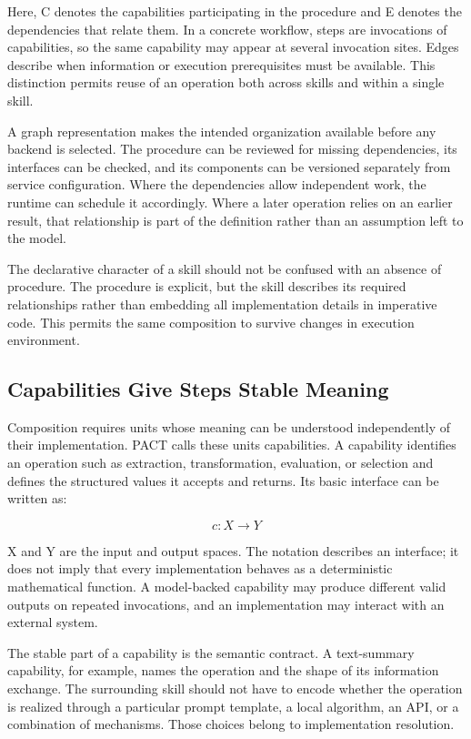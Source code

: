 \documentclass[10pt,twocolumn,a4paper]{article}
\begin{document}
Here, C denotes the capabilities participating in the procedure and E denotes the dependencies that relate them. In a concrete workflow, steps are invocations of capabilities, so the same capability may appear at several invocation sites. Edges describe when information or execution prerequisites must be available. This distinction permits reuse of an operation both across skills and within a single skill.


A graph representation makes the intended organization available before any backend is selected. The procedure can be reviewed for missing dependencies, its interfaces can be checked, and its components can be versioned separately from service configuration. Where the dependencies allow independent work, the runtime can schedule it accordingly. Where a later operation relies on an earlier result, that relationship is part of the definition rather than an assumption left to the model.


The declarative character of a skill should not be confused with an absence of procedure. The procedure is explicit, but the skill describes its required relationships rather than embedding all implementation details in imperative code. This permits the same composition to survive changes in execution environment.


\subsection{Capabilities Give Steps Stable Meaning}

Composition requires units whose meaning can be understood independently of their implementation. PACT calls these units capabilities. A capability identifies an operation such as extraction, transformation, evaluation, or selection and defines the structured values it accepts and returns. Its basic interface can be written as:


\begin{equation}c: X \rightarrow Y\end{equation}

X and Y are the input and output spaces. The notation describes an interface; it does not imply that every implementation behaves as a deterministic mathematical function. A model-backed capability may produce different valid outputs on repeated invocations, and an implementation may interact with an external system.


The stable part of a capability is the semantic contract. A text-summary capability, for example, names the operation and the shape of its information exchange. The surrounding skill should not have to encode whether the operation is realized through a particular prompt template, a local algorithm, an API, or a combination of mechanisms. Those choices belong to implementation resolution.
\end{document}
